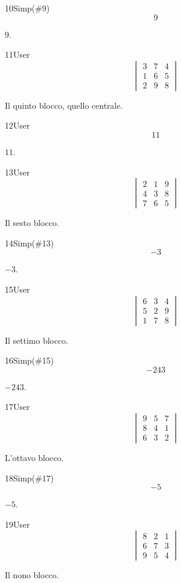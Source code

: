 \begin{espr}{10}{Simp(\#9)}{}
\[
9
\]
\end{espr}
$9$.

\begin{espr}{11}{User}{}
\[
\begin{vmatrix} 3 & 7 & 4 \\ 1 & 6 & 5 \\ 2 & 9 & 8 \end{vmatrix}
\]
\end{espr}
Il quinto blocco, quello centrale.

\begin{espr}{12}{User}{}
\[
11
\]
\end{espr}
$11$.

\begin{espr}{13}{User}{}
\[
\begin{vmatrix} 2 & 1 & 9 \\ 4 & 3 & 8 \\ 7 & 6 & 5 \end{vmatrix}
\]
\end{espr}
Il sesto blocco.

\begin{espr}{14}{Simp(\#13)}{}
\[
-3
\]
\end{espr}
$-3$.

\begin{espr}{15}{User}{}
\[
\begin{vmatrix} 6 & 3 & 4 \\ 5 & 2 & 9 \\ 1 & 7 & 8 \end{vmatrix}
\]
\end{espr}
Il settimo blocco.

\begin{espr}{16}{Simp(\#15)}{}
\[
-243
\]
\end{espr}
$-243$.

\begin{espr}{17}{User}{}
\[
\begin{vmatrix} 9 & 5 & 7 \\ 8 & 4 & 1 \\ 6 & 3 & 2 \end{vmatrix}
\]
\end{espr}
L'ottavo blocco.

\begin{espr}{18}{Simp(\#17)}{}
\[
-5
\]
\end{espr}
$-5$.

\begin{espr}{19}{User}{}
\[
\begin{vmatrix} 8 & 2 & 1 \\ 6 & 7 & 3 \\ 9 & 5 & 4 \end{vmatrix}
\]
\end{espr}
Il nono blocco.

